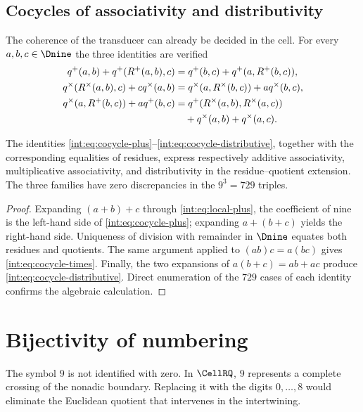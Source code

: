 \subsection{Cocycles of associativity and distributivity}

The coherence of the transducer can already be decided in the cell. For every
$a,b,c\in\Dnine$ the three identities are verified
\begin{align}
q^+(a,b)+q^+(R^+(a,b),c)
&=q^+(b,c)+q^+(a,R^+(b,c)),\label{int:eq:cocycle-plus}\\
q^\times(R^\times(a,b),c)+cq^\times(a,b)
&=q^\times(a,R^\times(b,c))+aq^\times(b,c),
\label{int:eq:cocycle-times}\\
q^\times(a,R^+(b,c))+aq^+(b,c)
&=q^+(R^\times(a,b),R^\times(a,c))\notag\\
&\quad+q^\times(a,b)+q^\times(a,c).
\label{int:eq:cocycle-distributive}
\end{align}

\begin{theorem}
The identities \eqref{int:eq:cocycle-plus}--\eqref{int:eq:cocycle-distributive},
together with the corresponding equalities of residues, express
respectively additive associativity, multiplicative associativity, and
distributivity in the residue--quotient extension. The three families have
zero discrepancies in the $9^3=729$ triples.
\end{theorem}

\begin{proof}
Expanding $(a+b)+c$ through \eqref{int:eq:local-plus}, the coefficient of
nine is the left-hand side of \eqref{int:eq:cocycle-plus}; expanding
$a+(b+c)$ yields the right-hand side. Uniqueness of division with remainder in
$\Dnine$ equates both residues and quotients. The same argument applied to
$(ab)c=a(bc)$ gives \eqref{int:eq:cocycle-times}. Finally, the two expansions of
$a(b+c)=ab+ac$ produce \eqref{int:eq:cocycle-distributive}. Direct enumeration
of the \(729\) cases of each identity confirms the algebraic
calculation.
\end{proof}

\section{Bijectivity of numbering}

The symbol $9$ is not identified with zero. In $\CellRQ$, $9$ represents a
complete crossing of the nonadic boundary. Replacing it with the digits
$0,\ldots,8$ would eliminate the Euclidean quotient that intervenes in the
intertwining.

